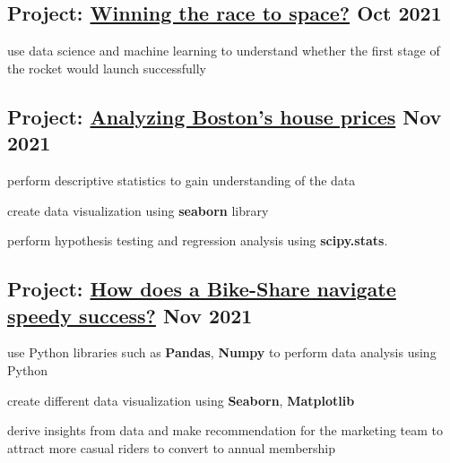 \documentclass[letter,10pt]{article}
\begin{document}
\subsection{{Project: \href{https://github.com/huongvo99/Case-study-Winning-the-race-to-space}{Winning the race to space?}  \hfill Oct 2021}}
\begin{zitemize}
\item use data science and machine learning to understand whether the first stage of the rocket would launch successfully
\end{zitemize}

\subsection{{Project: \href{https://github.com/huongvo99/Case-study-Winning-the-race-to-space}{Analyzing Boston’s house prices}  \hfill Nov 2021}}
\begin{zitemize}
\item perform descriptive statistics to gain understanding of the data
\item create data visualization using \textbf{seaborn} library
\item perform hypothesis testing and regression analysis using \textbf{scipy.stats}.
\end{zitemize}

\subsection{{Project: \href{https://github.com/huongvo99/Case-study-bike-share_company-navigate-speedy-success-}{How does a Bike-Share navigate speedy success?}  \hfill Nov 2021}}
\begin{zitemize}
\item use Python libraries such as \textbf{Pandas}, \textbf{Numpy} to perform data analysis using Python
\item create different data visualization using \textbf{Seaborn}, \textbf{Matplotlib}
\item derive insights from data and make recommendation for the marketing team to attract more casual riders to convert to annual membership
\end{zitemize}
\end{document}
